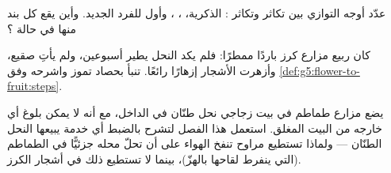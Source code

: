 \begin{exercise}[$\star\star$]\label{exo:g5:flower-to-fruit:9}
عدّد أوجه التوازي بين تكاثر  وتكاثر : 
الذكرية، ، ، وأول  للفرد الجديد. وأين يقع كل
بند منها في حالة ؟
\end{exercise}

\begin{exercise}[$\star\star$]\label{exo:g5:flower-to-fruit:10}
كان ربيع مزارع كرز باردًا ممطرًا: فلم يكد النحل يطير أسبوعين، ولم
يأتِ صقيع، وأزهرت الأشجار إزهارًا رائعًا. تنبأ بحصاد تموز واشرحه
وفق \cref{def:g5:flower-to-fruit:steps}.
\end{exercise}

\begin{exercise}[$\star\star\star$]\label{exo:g5:flower-to-fruit:11}
يضع مزارع طماطم في بيت زجاجي  نحل طنّان في الداخل، مع أنه لا
يمكن بلوغ أي  خارجه من البيت المغلق. استعمل هذا الفصل لتشرح
بالضبط أي خدمة يبيعها النحل الطنّان --- ولماذا تستطيع مراوح تنفخ
الهواء على  أن تحلّ محله جزئيًّا في الطماطم (التي ينفرط
لقاحها بالهزّ)، بينما لا تستطيع ذلك في أشجار الكرز.
\end{exercise}
